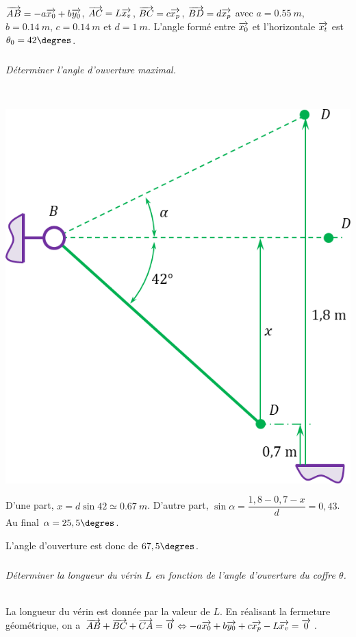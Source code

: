 \documentclass[10pt,fleqn]{article} %
\begin{document}
\begin{multicols}{2}
\begin{multicols}{2}
$\overrightarrow{AB}=-a\overrightarrow{x_0}+b\overrightarrow{y_0}$, $\overrightarrow{AC}=L\overrightarrow{x_v}$, $\overrightarrow{BC}=c\overrightarrow{x_p}$, $\overrightarrow{BD}=d\overrightarrow{x_p}$ avec $a=\SI{0,55}{m}$, $b=\SI{0,14}{m}$, $c=\SI{0,14}{m}$  et $d=\SI{1}{m}$. L’angle formé entre $\overrightarrow{x_0}$ et l’horizontale $\overrightarrow{x_t}$ est $\theta_0 = 42\degres$.
\fi

\subparagraph{}
\textit{Déterminer l’angle d’ouverture maximal.}
\ifprof
\begin{corrige}~\\
\begin{center}
\includegraphics[width=\linewidth]{images/cor_01}
\end{center}
D'une part, $x = d\sin 42 \simeq \SI{0,67}{m}$. D'autre part, $\sin\alpha = \dfrac{1,8-0,7-x}{d}=0,43$. Au final $\alpha = 25,5\degres$. 

L'angle d'ouverture est donc de $67,5\degres$.

\end{corrige}
\else
\fi


\subparagraph{}
\textit{Déterminer la longueur du vérin $L$ en fonction de l’angle d’ouverture du coffre $\theta$.}
\ifprof
\begin{corrige}~\\
La longueur du vérin est donnée par la valeur de $L$. En réalisant la fermeture géométrique, on a $\overrightarrow{AB}+\overrightarrow{BC}+\overrightarrow{CA}=\overrightarrow{0} \Leftrightarrow 
-a\overrightarrow{x_0}+b\overrightarrow{y_0} + c\overrightarrow{x_p} -L\overrightarrow{x_v} =\overrightarrow{0}$.


\end{corrige}
\end{multicols}
\end{multicols}
\end{document}
